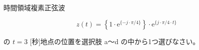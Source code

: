 時間領域複素正弦波

\[
z(t) =  \left \{ 1 \cdot \textrm{e}^{\{-j \cdot \pi/4 \}} \right \} \cdot \textrm{e}^{\{ j \cdot \pi/4 \cdot t \}}
\]

\bigskip
\noindent の $t = 3$ [秒]地点の位置を選択肢 a〜d の中から1つ選びなさい。

